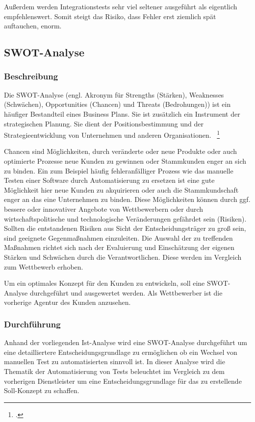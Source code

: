 Außerdem werden Integrationstests sehr viel seltener ausgeführt als eigentlich empfehlenswert. Somit steigt das Risiko, dass Fehler erst ziemlich spät auftauchen, enorm.  

\subsection{SWOT-Analyse}\label{swot-analyse}
\subsubsection{Beschreibung}
Die SWOT-Analyse (engl. Akronym für Strengths (Stärken), Weaknesses (Schwächen), Opportunities (Chancen) und Threats (Bedrohungen)) ist ein häufiger Bestandteil eines Business Plans. Sie ist zusätzlich ein Instrument der strategischen Planung. Sie dient der Positionsbestimmung und der Strategieentwicklung von Unternehmen und anderen Organisationen. ~\footcite[Vgl. Seite 240]{Meffert.2012}

Chancen sind Möglichkeiten, durch veränderte oder neue Produkte oder auch optimierte Prozesse neue Kunden zu gewinnen oder Stammkunden enger an sich zu binden. Ein zum Beispiel häufig fehleranfälliger Prozess wie das manuelle Testen einer Software durch Automatisierung zu ersetzen ist eine gute Möglichkeit hier neue Kunden zu akquirieren oder auch die Stammkundschaft enger an das eine Unternehmen zu binden. Diese Möglichkeiten können durch ggf. bessere oder innovativer Angebote von Wettbewerbern oder durch wirtschaftspolitische und technologische Veränderungen gefährdet sein (Risiken). Sollten die entstandenen Risiken aus Sicht der Entscheidungsträger zu groß sein, sind geeignete Gegenmaßnahmen einzuleiten. Die Auswahl der zu treffenden Maßnahmen richtet sich nach der Evaluierung und Einschätzung der eigenen Stärken und Schwächen durch die Verantwortlichen. Diese werden im Vergleich zum Wettbewerb erhoben.

Um ein optimales Konzept für den Kunden zu entwickeln, soll eine SWOT-Analyse durchgeführt und ausgewertet werden. Als Wettbewerber ist die vorherige Agentur des Kunden anzusehen.

\subsubsection{Durchführung}
Anhand der vorliegenden Ist-Analyse wird eine SWOT-Analyse durchgeführt um eine detailliertere Entscheidungsgrundlage zu ermöglichen ob ein Wechsel von manuellen Test zu automatisierten sinnvoll ist. In dieser Analyse wird die Thematik der Automatisierung von Tests beleuchtet im Vergleich zu dem vorherigen Dienstleister um eine Entscheidungsgrundlage für das zu erstellende Soll-Konzept zu schaffen.

